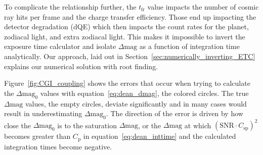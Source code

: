 To complicate the relationship further, the $t_{\textrm{fr}}$ value impacts the
number of cosmic ray hits per frame and the charge transfer efficiency. Those
end up impacting the detector degradation (dQE) which then impacts the count
rates for the planet, zodiacal light, and extra zodiacal light. This makes it
impossible to invert the exposure time calculator and isolate
$\Delta\textrm{mag}$ as a function of integration time analytically. Our approach,
laid out in Section~\ref{sec:numerically_inverting_ETC} explains our numerical
solution with root finding.

Figure~\ref{fig:CGI_coupling} shows the errors that occur when trying to
calculate the $\Delta\textrm{mag}_0$ values with equation~\ref{eq:dean_dmag},
the colored circles. The true $\Delta\textrm{mag}$ values, the empty circles,
deviate significantly and in many cases would result in underestimating
$\Delta\textrm{mag}_0$. The direction of the error is driven by how close the
$\Delta\textrm{mag}_0$ is to the saturation $\Delta\textrm{mag}$, or the
$\Delta\textrm{mag}$ at which $\left(\textrm{SNR} \cdot C_{\textrm{sp}}\right)^2$ becomes greater than $C_{\textrm{p}}$ in
equation~\ref{eq:dean_inttime} and the calculated integration times become
negative.



